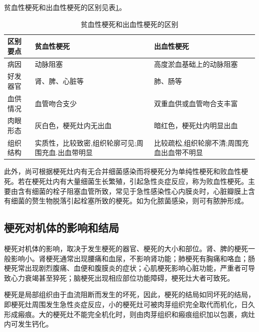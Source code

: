 贫血性梗死和出血性梗死的区别见表\ref{tab3-2}。
\begin{table}[ht]
  \caption{贫血性梗死和出血性梗死的区别}
  \label{tab3-2}
  \centering
  \begin{tabular}{lp{5cm}p{5cm}}
    \toprule
    区别要点 & 贫血性梗死
             & 出血性梗死                                                                                     \\
    \midrule
    病因     & 动脉阻塞                                          &
    高度淤血基础上的动脉阻塞                                                                                  \\
    好发器官 & 肾、脾、心脏等
             & 肺、肠等                                                                                       \\
    血供情况 & 血管吻合支少                                      & 双重血供或血管吻合支丰富                   \\
    肉眼形态 & 灰白色，梗死灶内无出血                            & 暗红色，梗死灶内明显出血                   \\
    组织结构 & 实质性，比较致密,组织轮廓可见;周围充血.出血带明显 & 比较疏松,组织轮廓不清;周围充血出血带不明显 \\
    \bottomrule
  \end{tabular}
\end{table}

此外，尚可根据梗死灶内有无合并细菌感染而将梗死分为单纯性梗死和败血性梗死。若在梗死灶内有大量细菌生长繁殖，引起急性炎症反应，称为败血性梗死。主要由含有细菌的栓子阻塞血管所致，常见于急性感染性心内膜炎时，心脏瓣膜上含有细菌的赘生物脱落引起栓塞所致的梗死。如为化脓菌感染，则可有脓肿形成。

\subsection{梗死对机体的影响和结局}

梗死对机体的影响，取决于发生梗死的器官、梗死的大小和部位。肾、脾的梗死一般影响小。肾梗死通常出现腰痛和血尿，不影响肾功能；肺梗死有胸痛和咯血；肠梗死常出现剧烈腹痛、血便和腹膜炎的症状；心肌梗死影响心脏功能，严重者可导致心力衰竭甚至猝死；脑梗死出现相应部位功能障碍，梗死灶大者可致死。

梗死是局部组织由于血流阻断而发生的坏死，因此，梗死的结局如同坏死的结局，即梗死灶周围发生急性炎症反应，小的梗死灶可被肉芽组织完全取代而机化，日久形成瘢痕。大的梗死灶不能完全机化时，则由肉芽组织和瘢痕组织加以包裹，病灶内可发生钙化。

